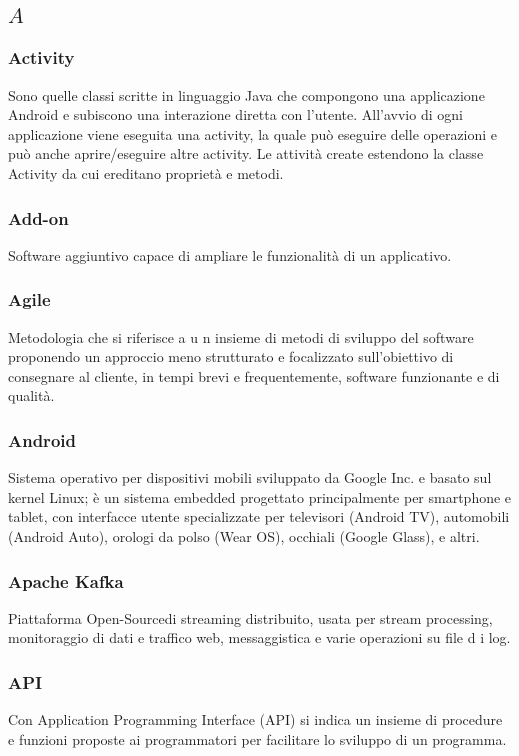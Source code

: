 \subsection*{\quad$A\quad$}
\subsubsection*{Activity}
Sono quelle classi scritte in linguaggio Java che compongono una applicazione Android e subiscono una interazione diretta con l'utente. All'avvio di ogni applicazione viene eseguita una activity, la quale può eseguire delle operazioni e può anche aprire/eseguire altre activity. Le attività create estendono la classe Activity da cui ereditano proprietà e metodi.

\subsubsection*{Add-on}
Software aggiuntivo capace di ampliare le funzionalità di un applicativo.

\subsubsection*{Agile}
Metodologia che si riferisce a u n insieme di metodi di sviluppo del software proponendo un approccio meno strutturato e focalizzato sull'obiettivo di consegnare al cliente, in tempi brevi e frequentemente, software funzionante e di qualità.

\subsubsection*{Android}
Sistema operativo per dispositivi mobili sviluppato da Google Inc. e basato sul kernel Linux; è un sistema embedded progettato principalmente per smartphone e tablet, con interfacce utente specializzate per televisori (Android TV), automobili (Android Auto), orologi da polso (Wear OS), occhiali (Google Glass), e altri.

\subsubsection*{Apache Kafka}
Piattaforma Open-Source\glosp di streaming distribuito, usata per stream processing, monitoraggio di dati e traffico web, messaggistica e varie operazioni su file d i log.

\subsubsection*{API}
Con Application Programming Interface (API) si indica un insieme di procedure e funzioni proposte ai programmatori per facilitare lo sviluppo di un programma.

